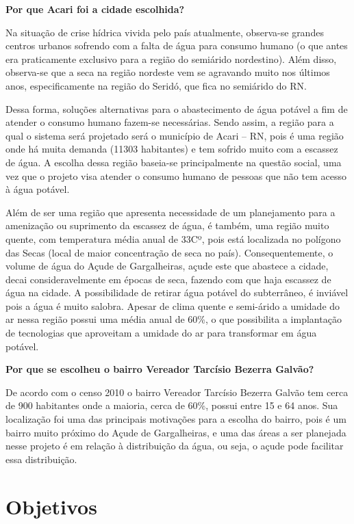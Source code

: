 \textbf{Por que  Acari foi a cidade escolhida?}

Na situação de crise hídrica vivida pelo país atualmente, observa-se grandes centros urbanos sofrendo com a falta de água
para consumo humano (o que antes era praticamente exclusivo para a região do semiárido nordestino). Além disso, observa-se que
a seca na região nordeste vem se agravando muito nos últimos anos, especificamente na região do Seridó, que fica no semiárido do RN.

Dessa forma, soluções alternativas para o abastecimento de água potável a fim de atender o consumo humano fazem-se necessárias. 
Sendo assim, a região para a qual o sistema será projetado será o município de Acari – RN, pois é uma região onde há muita
demanda (11303 habitantes) e tem sofrido muito com a escassez de água. A escolha dessa região baseia-se principalmente na 
questão social, uma vez que o projeto visa atender o consumo humano de pessoas que não tem acesso à água potável.

Além de ser uma região que apresenta necessidade de um planejamento para a amenização ou suprimento da escassez de água, é 
também, uma região muito quente, com temperatura média anual de 33Cº, pois está localizada no polígono das Secas 
(local de maior concentração de seca no país). Consequentemente, o volume de água do Açude de Gargalheiras, açude este que
abastece a cidade, decai consideravelmente em épocas de seca, fazendo com que haja escassez de água na cidade. A possibilidade
de retirar água potável do subterrâneo, é inviável pois a água é muito salobra. Apesar de clima quente e semi-árido a umidade
do ar nessa região  possui uma média anual de 60\%, o que possibilita a implantação de tecnologias que aproveitam a umidade do ar
para transformar em água potável.

\textbf{Por que se escolheu o bairro Vereador Tarcísio Bezerra Galvão?}

De acordo com o censo 2010 o bairro Vereador Tarcísio Bezerra Galvão tem cerca de 900 habitantes onde a maioria, cerca de 60\%,
possui entre 15 e 64 anos. Sua localização foi uma das principais motivações para a escolha do bairro, pois é um bairro muito
próximo do Açude de Gargalheiras, e uma das áreas a ser planejada nesse projeto é em relação à distribuição da água, ou seja,
o açude pode facilitar essa distribuição.


\section{Objetivos}

